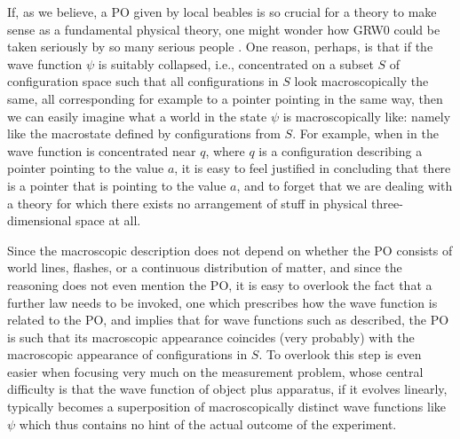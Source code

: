 \documentclass[12pt]{article}
\begin{document}
If, as we believe, a PO given by local beables is so crucial for a theory
to make sense as a fundamental physical theory, one might wonder how {\sf
  GRW0} could be taken seriously by so many serious people \citep[see,
e.g.,][]{albert,albert1,rimini,plewis}. One reason, perhaps, is that if the
wave function $\psi$ is suitably collapsed, i.e., concentrated on a subset
$S$ of configuration space such that all configurations in $S$ look
macroscopically the same, all corresponding for example to a pointer
pointing in the same way, then we can easily imagine what a world in the
state $\psi$ is macroscopically like: namely like the macrostate defined by
configurations from $S$. For example, when in {} the wave function
is concentrated near $q$, where $q$ is a configuration describing a pointer
pointing to the value $a$, it is easy to feel justified in concluding that
there is a pointer that is pointing to the value $a$, and to forget that we
are dealing with a theory for which there exists no arrangement of stuff in
physical three-dimensional space at all. 

Since the macroscopic description
does not depend on whether the PO consists of world lines, flashes, or a
continuous distribution of matter, and since the reasoning does not even
mention the PO, it is easy to overlook the fact that a further law needs to
be invoked, one which prescribes how the wave function is related to the
PO, and implies that for wave functions such as described, the \textrm{PO}
is such that its macroscopic appearance coincides (very probably) with the
macroscopic appearance of configurations in $S$. To overlook this step is
even easier when focusing very much on the measurement problem, whose
central difficulty is that the wave function of object plus apparatus, if
it evolves linearly, typically becomes a superposition of macroscopically
distinct wave functions like $\psi$ which thus contains no hint of the
actual outcome of the experiment.





\label{sec:PO3N}
\end{document}

